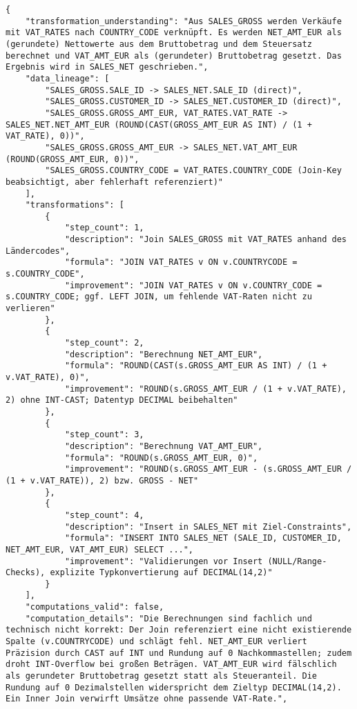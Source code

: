 \begin{lstlisting}[caption={Ausgabe: GPT-5 Anwendungsfall 5 Konsistenzdurchlauf},label={gpt_case5_prompt2}]
{
    "transformation_understanding": "Aus SALES_GROSS werden Verkäufe mit VAT_RATES nach COUNTRY_CODE verknüpft. Es werden NET_AMT_EUR als (gerundete) Nettowerte aus dem Bruttobetrag und dem Steuersatz berechnet und VAT_AMT_EUR als (gerundeter) Bruttobetrag gesetzt. Das Ergebnis wird in SALES_NET geschrieben.",
    "data_lineage": [
        "SALES_GROSS.SALE_ID -> SALES_NET.SALE_ID (direct)",
        "SALES_GROSS.CUSTOMER_ID -> SALES_NET.CUSTOMER_ID (direct)",
        "SALES_GROSS.GROSS_AMT_EUR, VAT_RATES.VAT_RATE -> SALES_NET.NET_AMT_EUR (ROUND(CAST(GROSS_AMT_EUR AS INT) / (1 + VAT_RATE), 0))",
        "SALES_GROSS.GROSS_AMT_EUR -> SALES_NET.VAT_AMT_EUR (ROUND(GROSS_AMT_EUR, 0))",
        "SALES_GROSS.COUNTRY_CODE = VAT_RATES.COUNTRY_CODE (Join-Key beabsichtigt, aber fehlerhaft referenziert)"
    ],
    "transformations": [
        {
            "step_count": 1,
            "description": "Join SALES_GROSS mit VAT_RATES anhand des Ländercodes",
            "formula": "JOIN VAT_RATES v ON v.COUNTRYCODE = s.COUNTRY_CODE",
            "improvement": "JOIN VAT_RATES v ON v.COUNTRY_CODE = s.COUNTRY_CODE; ggf. LEFT JOIN, um fehlende VAT-Raten nicht zu verlieren"
        },
        {
            "step_count": 2,
            "description": "Berechnung NET_AMT_EUR",
            "formula": "ROUND(CAST(s.GROSS_AMT_EUR AS INT) / (1 + v.VAT_RATE), 0)",
            "improvement": "ROUND(s.GROSS_AMT_EUR / (1 + v.VAT_RATE), 2) ohne INT-CAST; Datentyp DECIMAL beibehalten"
        },
        {
            "step_count": 3,
            "description": "Berechnung VAT_AMT_EUR",
            "formula": "ROUND(s.GROSS_AMT_EUR, 0)",
            "improvement": "ROUND(s.GROSS_AMT_EUR - (s.GROSS_AMT_EUR / (1 + v.VAT_RATE)), 2) bzw. GROSS - NET"
        },
        {
            "step_count": 4,
            "description": "Insert in SALES_NET mit Ziel-Constraints",
            "formula": "INSERT INTO SALES_NET (SALE_ID, CUSTOMER_ID, NET_AMT_EUR, VAT_AMT_EUR) SELECT ...",
            "improvement": "Validierungen vor Insert (NULL/Range-Checks), explizite Typkonvertierung auf DECIMAL(14,2)"
        }
    ],
    "computations_valid": false,
    "computation_details": "Die Berechnungen sind fachlich und technisch nicht korrekt: Der Join referenziert eine nicht existierende Spalte (v.COUNTRYCODE) und schlägt fehl. NET_AMT_EUR verliert Präzision durch CAST auf INT und Rundung auf 0 Nachkommastellen; zudem droht INT-Overflow bei großen Beträgen. VAT_AMT_EUR wird fälschlich als gerundeter Bruttobetrag gesetzt statt als Steueranteil. Die Rundung auf 0 Dezimalstellen widerspricht dem Zieltyp DECIMAL(14,2). Ein Inner Join verwirft Umsätze ohne passende VAT-Rate.",

\end{lstlisting}
